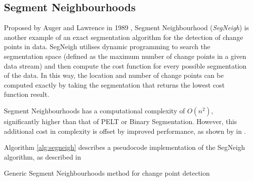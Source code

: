 \documentclass{uvamscse}	%
\begin{document}
\subsection{Segment Neighbourhoods}

Proposed by Auger and Lawrence in 1989 \cite{Auger1989}, Segment Neighbourhood (\emph{SegNeigh}) is another example of an exact segmentation algorithm for the detection of change points in data. SegNeigh utilises dynamic programming to search the segmentation space (defined as the maximum number of change points in a given data stream) and then compute the cost function for every possible segmentation of the data. In this way, the location and number of change points can be computed exactly by taking the segmentation that returns the lowest cost function result.

Segment Neighbourhoods has a computational complexity of $O(n^2)$, significantly higher than that of PELT or Binary Segmentation. However, this additional cost in complexity is offset by improved performance, as shown by \citeauthor{Braun2000} in  \cite{Braun2000}.

Algorithm \autoref{alg:segneigh} describes a pseudocode implementation of the SegNeigh algorithm, as described in \cite{Eckley2011}\newline

\begin{algorithm}[H]
\label{alg:segneigh}
    \caption{Generic Segment Neighbourhoods method for change point detection}
    \DontPrintSemicolon
        
        
\end{algorithm}
\end{document}
